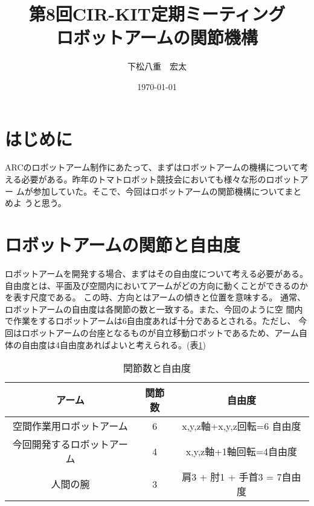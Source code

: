 \documentclass[12pt,a4j]{jarticle}
\title {第8回CIR-KIT定期ミーティング\\ロボットアームの関節機構}
\author {下松八重　宏太}
\date {\today}
\begin{document}
\maketitle

\section{はじめに}
ARCのロボットアーム制作にあたって、まずはロボットアームの機構について考
える必要がある。昨年のトマトロボット競技会においても様々な形のロボットアー
ムが参加していた。そこで、今回はロボットアームの関節機構についてまとめよ
うと思う。

\section{ロボットアームの関節と自由度}
ロボットアームを開発する場合、まずはその自由度について考える必要がある。
自由度とは、平面及び空間内においてアームがどの方向に動くことができるのか
を表す尺度である。
この時、方向とはアームの傾きと位置を意味する。
通常、ロボットアームの自由度は各関節の数と一致する。また、今回のように空
間内で作業をするロボットアームは6自由度あれば十分であるとされる。ただし、
今回はロボットアームの台座となるものが自立移動ロボットであるため、アーム自体の自由度は4自由度あればよいと考えられる。(表\ref{tab:arm})
 
\begin{table}[htb]
\begin{center}
  \caption{関節数と自由度}
  \begin{tabular}{|c|c|c|} \hline
  アーム&関節数 &自由度 \\ \hline \hline
  空間作業用ロボットアーム&6&x,y,z軸+x,y,z回転=6
	  自由度\\ \hline
  今回開発するロボットアーム& 4&x,y,z軸+1軸回転=4自由度\\ \hline
  人間の腕&3& 肩3 + 肘1 + 手首3 = 7自由度\\ \hline
  \end{tabular}
\label{tab:arm}
\end{center}
\end{table}
\end{document}
